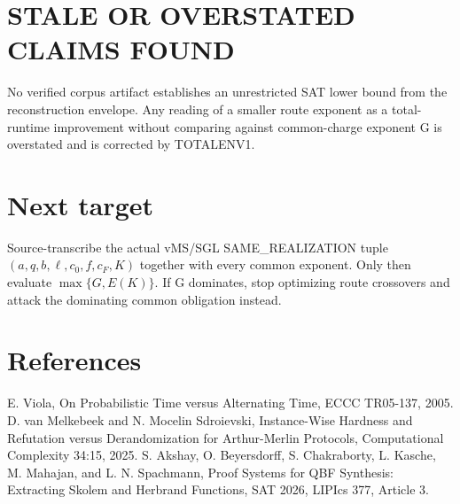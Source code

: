\documentclass[11pt]{article}
\begin{document}
\section*{STALE OR OVERSTATED CLAIMS FOUND}
No verified corpus artifact establishes an unrestricted SAT lower bound from the reconstruction envelope. Any reading of a smaller route exponent as a total-runtime improvement without comparing against common-charge exponent G is overstated and is corrected by TOTALENV1.
\section*{Next target}
Source-transcribe the actual vMS/SGL SAME\_REALIZATION tuple \((a,q,b,\ell,c_0,f,c_F,K)\) together with every common exponent. Only then evaluate \(\max\{G,E(K)\}\). If G dominates, stop optimizing route crossovers and attack the dominating common obligation instead.
\section*{References}
E. Viola, On Probabilistic Time versus Alternating Time, ECCC TR05-137, 2005.
D. van Melkebeek and N. Mocelin Sdroievski, Instance-Wise Hardness and Refutation versus Derandomization for Arthur-Merlin Protocols, Computational Complexity 34:15, 2025.
S. Akshay, O. Beyersdorff, S. Chakraborty, L. Kasche, M. Mahajan, and L. N. Spachmann, Proof Systems for QBF Synthesis: Extracting Skolem and Herbrand Functions, SAT 2026, LIPIcs 377, Article 3.
\end{document}

